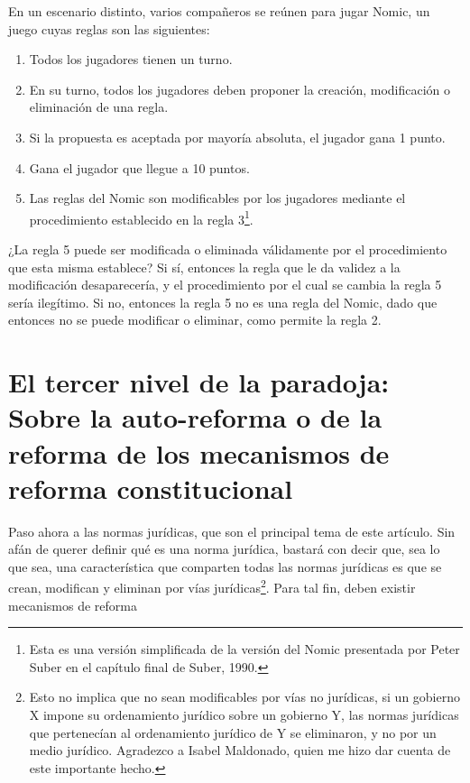 \documentclass[]{book}
\begin{document}
\begin{refsection}
En un escenario distinto, varios compañeros se reúnen para jugar Nomic,
un juego cuyas reglas son las siguientes:

\begin{enumerate}
\def\labelenumi{\arabic{enumi}.}
\item
  \protect\hypertarget{_Hlk508135530}{}{}Todos los jugadores tienen un
  turno.
\item
  En su turno, todos los jugadores deben proponer la creación,
  modificación o eliminación de una regla.
\item
  Si la propuesta es aceptada por mayoría absoluta, el jugador gana 1
  punto.
\item
  Gana el jugador que llegue a 10 puntos.
\item
  Las reglas del Nomic son modificables por los jugadores mediante el
  procedimiento establecido en la regla 3\footnote{Esta es una versión
    simplificada de la versión del Nomic presentada por Peter Suber en
    el capítulo final de Suber, 1990.}.
\end{enumerate}

¿La regla 5 puede ser modificada o eliminada válidamente por el
procedimiento que esta misma establece? Si sí, entonces la regla que le
da validez a la modificación desaparecería, y el procedimiento por el
cual se cambia la regla 5 sería ilegítimo. Si no, entonces la regla 5 no
es una regla del Nomic, dado que entonces no se puede modificar o
eliminar, como permite la regla 2.

\section*{El tercer nivel de la paradoja: Sobre la auto-reforma o de la reforma de los mecanismos de reforma constitucional}

Paso ahora a las normas jurídicas, que son el principal tema de este
artículo. Sin afán de querer definir qué es una norma jurídica, bastará
con decir que, sea lo que sea, una característica que comparten todas
las normas jurídicas es que se crean, modifican y eliminan por vías
jurídicas\footnote{Esto no implica que no sean modificables por vías no
  jurídicas, si un gobierno X impone su ordenamiento jurídico sobre un gobierno Y, las  normas jurídicas que pertenecían al ordenamiento jurídico de Y se eliminaron, y no por un  medio jurídico. Agradezco a Isabel Maldonado, quien me hizo dar cuenta
  de este importante hecho.}. Para tal fin, deben existir mecanismos de
reforma


\end{refsection}
\end{document}

